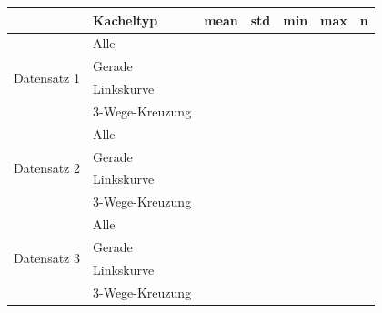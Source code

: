 \begin{tabular}[t]{|c|l|l|l|l|l|l|}
	\hline
	 & \textbf{Kacheltyp} & \textbf{mean} & \textbf{std} & \textbf{min} & \textbf{max} & \textbf{n} \\
	\hline
	\multirow{4}{*}{Datensatz 1} 
	& Alle & & & & & \\
	\cline{2-7}
	& Gerade & & & & & \\
	\cline{2-7}
	& Linkskurve & & & & & \\
	\cline{2-7}
	& 3-Wege-Kreuzung & & & & & \\
	\hline
	\multirow{4}{*}{Datensatz 2} 
	& Alle & & & & & \\
	\cline{2-7}
	& Gerade & & & & & \\
	\cline{2-7}
	& Linkskurve & & & & & \\
	\cline{2-7}
	& 3-Wege-Kreuzung & & & & & \\
	\hline
	\multirow{4}{*}{Datensatz 3} 
	& Alle & & & & & \\
	\cline{2-7}
	& Gerade & & & & & \\
	\cline{2-7}
	& Linkskurve & & & & & \\
	\cline{2-7}
	& 3-Wege-Kreuzung & & & & & \\
	\hline
\end{tabular}